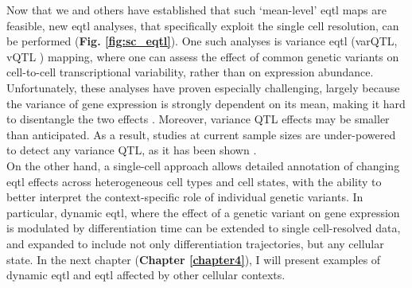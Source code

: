 Now that we and others have established that such `mean-level' \gls{eqtl} maps are feasible, new \gls{eqtl} analyses, that specifically exploit the single cell resolution, can be performed (\textbf{Fig. \ref{fig:sc_eqtl}}).
One such analyses is variance \gls{eqtl} (varQTL, vQTL \cite{ayroles2015behavioral}) mapping, where one can assess the effect of common genetic variants on cell-to-cell transcriptional variability, rather than on expression abundance.
Unfortunately, these analyses have proven especially challenging, largely because the variance of gene expression is strongly dependent on its mean, making it hard to disentangle the two effects \cite{vallejos2016beyond}.
Moreover, variance QTL effects may be smaller than anticipated.
As a result, studies at current sample sizes are under-powered to detect any variance QTL, as 
it has been shown \cite{sarkar2019discovery}. \\

On the other hand, a single-cell approach allows detailed annotation of changing \gls{eqtl} effects across heterogeneous cell types and cell states, with the ability to better interpret the context-specific role of individual genetic variants. 
In particular, dynamic \gls{eqtl}, where the effect of a genetic variant on gene expression is modulated by differentiation time \cite{francesconi2014effects, strober2019dynamic} can be extended to single cell-resolved data, and expanded to include not only differentiation trajectories, but any cellular state.
In the next chapter (\textbf{Chapter 
\ref{chapter4}}),
I will present examples of dynamic \gls{eqtl} and \gls{eqtl} affected by other cellular contexts.